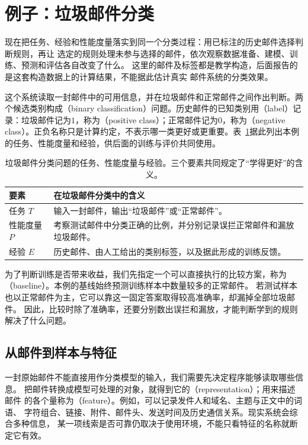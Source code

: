 \section{例子：垃圾邮件分类}
\label{sec:spam-classification-example}

现在把任务、经验和性能度量落实到同一个分类过程：用已标注的历史邮件选择判断规则，再让
选定的规则处理未参与选择的邮件，依次观察数据准备、建模、训练、预测和评估各自改变了什么。
这里的邮件及标签都是教学构造，后面报告的是这套构造数据上的计算结果，不能据此估计真实
邮件系统的分类效果。

这个系统读取一封邮件中的可用信息，并在垃圾邮件和正常邮件之间作出判断。两个候选类别构成（binary classification）问题。历史邮件的已知类别用（label）记录：垃圾邮件记为$1$，称为（positive class）；正常邮件记为$0$，称为（negative class）。正负名称只是计算约定，不表示哪一类更好或更重要。表~\ref{tab:spam-three-elements}据此列出本例的任务、性能度量和经验，供后面的训练与评价共同使用。

\begin{table}[htbp]
  \centering
  \small
  \begin{tabularx}{\linewidth}{@{}lX@{}}
    \toprule
    \textbf{要素} & \textbf{在垃圾邮件分类中的含义} \\
    \midrule
    任务 $T$ & 输入一封邮件，输出“垃圾邮件”或“正常邮件”。 \\
    性能度量 $P$ & 考察测试邮件中分类正确的比例，并分别记录误拦正常邮件和漏放垃圾邮件。 \\
    经验 $E$ & 历史邮件、由人工给出的类别标签，以及据此形成的训练反馈。 \\
    \bottomrule
  \end{tabularx}
  \caption{垃圾邮件分类问题的任务、性能度量与经验。三个要素共同规定了“学得更好”的含义。}
  \label{tab:spam-three-elements}
\end{table}

为了判断训练是否带来收益，我们先指定一个可以直接执行的比较方案，称为
（baseline）。本例的基线始终预测训练样本中数量较多的正常邮件。
若测试样本也以正常邮件为主，它可以靠这一固定答案取得较高准确率，却漏掉全部垃圾邮件。
因此，比较时除了准确率，还要分别数出误拦和漏放，才能判断学到的规则解决了什么问题。

\subsection{从邮件到样本与特征}

一封原始邮件不能直接用作分类模型的输入，我们需要先决定程序能够读取哪些信息。
把邮件转换成模型可处理的对象，就得到它的（representation）；用来描述邮件
的各个量称为（feature）。例如，可以记录发件人和域名、主题与正文中的词语、
字符组合、链接、附件、邮件头、发送时间及历史通信关系。现实系统会综合多种信息，
某一项线索是否可靠仍取决于使用环境，不能只看特征的名称就断定它有效。

